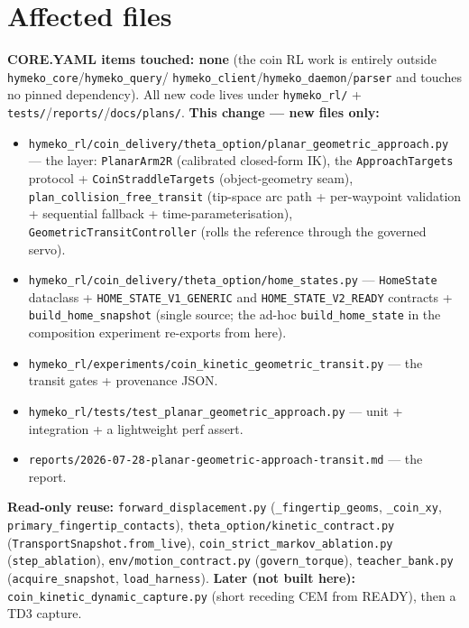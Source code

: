 \documentclass[11pt]{article}
\newcommand{\code}[1]{\texttt{\small #1}}
\begin{document}
\section{Affected files}
\textbf{CORE.YAML items touched: none} (the coin RL work is entirely outside \code{hymeko\_core}/\code{hymeko\_query}/
\code{hymeko\_client}/\code{hymeko\_daemon}/\code{parser} and touches no pinned dependency). All new code lives under
\code{hymeko\_rl/} + \code{tests/}/\code{reports/}/\code{docs/plans/}.
\smallskip\noindent\textbf{This change --- new files only:}
\begin{itemize}[nosep,leftmargin=1.4em]
  \item \code{hymeko\_rl/coin\_delivery/theta\_option/planar\_geometric\_approach.py} --- the layer: \code{PlanarArm2R}
  (calibrated closed-form IK), the \code{ApproachTargets} protocol + \code{CoinStraddleTargets} (object-geometry seam),
  \code{plan\_collision\_free\_transit} (tip-space arc path + per-waypoint validation + sequential fallback +
  time-parameterisation), \code{GeometricTransitController} (rolls the reference through the governed servo).
  \item \code{hymeko\_rl/coin\_delivery/theta\_option/home\_states.py} --- \code{HomeState} dataclass +
  \code{HOME\_STATE\_V1\_GENERIC} and \code{HOME\_STATE\_V2\_READY} contracts + \code{build\_home\_snapshot}
  (single source; the ad-hoc \code{build\_home\_state} in the composition experiment re-exports from here).
  \item \code{hymeko\_rl/experiments/coin\_kinetic\_geometric\_transit.py} --- the transit gates + provenance JSON.
  \item \code{hymeko\_rl/tests/test\_planar\_geometric\_approach.py} --- unit + integration + a lightweight perf assert.
  \item \code{reports/2026-07-28-planar-geometric-approach-transit.md} --- the report.
\end{itemize}
\textbf{Read-only reuse:} \code{forward\_displacement.py} (\code{\_fingertip\_geoms}, \code{\_coin\_xy},
\code{primary\_fingertip\_contacts}), \code{theta\_option/kinetic\_contract.py} (\code{TransportSnapshot.from\_live}),
\code{coin\_strict\_markov\_ablation.py} (\code{step\_ablation}), \code{env/motion\_contract.py} (\code{govern\_torque}),
\code{teacher\_bank.py} (\code{acquire\_snapshot}, \code{load\_harness}). \textbf{Later (not built here):}
\code{coin\_kinetic\_dynamic\_capture.py} (short receding CEM from READY), then a TD3 capture.
\end{document}

